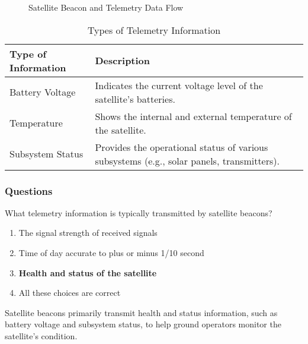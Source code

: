 \begin{figure}[h]
    \centering
    \caption{Satellite Beacon and Telemetry Data Flow}
    \label{fig:sat-beacon-telemetry}
\end{figure}

\begin{table}[h]
    \centering
    \begin{tabular}{|l|l|}
        \hline
        \textbf{Type of Information} & \textbf{Description} \\
        \hline
        Battery Voltage & Indicates the current voltage level of the satellite's batteries. \\
        Temperature & Shows the internal and external temperature of the satellite. \\
        Subsystem Status & Provides the operational status of various subsystems (e.g., solar panels, transmitters). \\
        \hline
    \end{tabular}
    \caption{Types of Telemetry Information}
    \label{tab:telemetry-types}
\end{table}

\subsubsection*{Questions}

\begin{tcolorbox}[colback=gray!10!white,colframe=black!75!black,title={T8B01}]
    What telemetry information is typically transmitted by satellite beacons?
    \begin{enumerate}[label=\Alph*),noitemsep]
        \item The signal strength of received signals
        \item Time of day accurate to plus or minus 1/10 second
        \item \textbf{Health and status of the satellite}
        \item All these choices are correct
    \end{enumerate}
\end{tcolorbox}
 Satellite beacons primarily transmit health and status information, such as battery voltage and subsystem status, to help ground operators monitor the satellite's condition.

